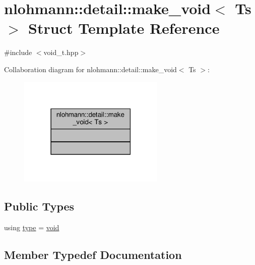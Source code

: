 \hypertarget{structnlohmann_1_1detail_1_1make__void}{}\section{nlohmann\+:\+:detail\+:\+:make\+\_\+void$<$ Ts $>$ Struct Template Reference}
\label{structnlohmann_1_1detail_1_1make__void}


{\ttfamily \#include $<$void\+\_\+t.\+hpp$>$}



Collaboration diagram for nlohmann\+:\+:detail\+:\+:make\+\_\+void$<$ Ts $>$\+:\nopagebreak
\begin{figure}[H]
\begin{center}
\leavevmode
\includegraphics[width=198pt]{structnlohmann_1_1detail_1_1make__void__coll__graph}
\end{center}
\end{figure}
\subsection*{Public Types}
\begin{DoxyCompactItemize}
\item 
using \hyperlink{structnlohmann_1_1detail_1_1make__void_a8961e24ae3b2cb65ec47d1ce805d94e4}{type} = \hyperlink{namespacenlohmann_1_1detail_a59fca69799f6b9e366710cb9043aa77d}{void}
\end{DoxyCompactItemize}


\subsection{Member Typedef Documentation}
\mbox{\label{structnlohmann_1_1detail_1_1make__void_a8961e24ae3b2cb65ec47d1ce805d94e4}} 
